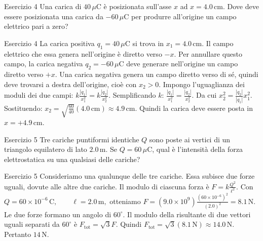 \documentclass[a4paper]{article}
\begin{document}
\begin{snippetexercise}{Esercizio 4}
    Una carica di \(40\,\mu\mathrm{C}\) è posizionata sull'asse \(x\) ad
    \(x = 4.0\,\mathrm{cm}\). Dove deve essere posizionata una carica da
    \(-60\,\mu\mathrm{C}\) per produrre all'origine un campo elettrico pari a
    zero?

\end{snippetexercise}
\begin{snippetsolution}{Esercizio 4}
    La carica positiva \(q_1 = 40\,\mu\mathrm{C}\) si trova in
    \(x_1 = 4.0\,\mathrm{cm}\). Il campo elettrico che essa genera
    nell'origine è diretto verso \(-x\).
    Per annullare questo campo, la carica negativa
    \(q_2 = -60\,\mu\mathrm{C}\) deve generare nell'origine un campo diretto
    verso \(+x\). Una carica negativa genera un campo diretto verso di sé,
    quindi deve trovarsi a destra dell'origine, cioè con \(x_2>0\).
    Impongo l'uguaglianza dei moduli dei due campi:
    \(k\frac{|q_1|}{x_1^2} = k\frac{|q_2|}{x_2^2}.\)
    Semplificando \(k\):
    \(\frac{|q_1|}{x_1^2} = \frac{|q_2|}{x_2^2}.\)
    Da cui
    \(x_2^2 = \frac{|q_2|}{|q_1|}x_1^2.\)
    Sostituendo:
    \(x_2 = \sqrt{ \frac{60}{40} } (4.0\,\mathrm{cm}) \approx 4.9\,\mathrm{cm}.\)
    Quindi la carica deve essere posta in
    \(\boxed{x = +4.9\,\mathrm{cm}}.\)
\end{snippetsolution}
\begin{snippetexercise}{Esercizio 5}
    Tre cariche puntiformi identiche \(Q\) sono poste ai vertici di un
    triangolo equilatero di lato \(2.0\,\mathrm{m}\). Se
    \(Q = 60\,\mu\mathrm{C}\), qual è l'intensità della forza elettrostatica su
    una qualsiasi delle cariche?

\end{snippetexercise}
\begin{snippetsolution}{Esercizio 5}
    Consideriamo una qualunque delle tre cariche. Essa subisce due forze
    uguali, dovute alle altre due cariche.
    Il modulo di ciascuna forza è
    \(F = k\frac{Q^2}{\ell^2}.\)
    Con
    \(Q = 60 \times 10^{-6}\,\mathrm{C}, \qquad \ell = 2.0\,\mathrm{m},\)
    otteniamo
    \(F = \left(9.0 \times 10^9\right) \frac{ \left(60 \times 10^{-6}\right)^2 }{(2.0)^2} = 8.1\,\mathrm{N}.\)
    Le due forze formano un angolo di \(60^\circ\). Il modulo della risultante
    di due vettori uguali separati da \(60^\circ\) è
    \(F_{\mathrm{tot}} = \sqrt{3}F.\)
    Quindi
    \(F_{\mathrm{tot}} = \sqrt{3}(8.1\,\mathrm{N}) \approx 14.0\,\mathrm{N}.\)
    Pertanto
    \(\boxed{14\,\mathrm{N}}.\)
\end{snippetsolution}
\end{document}
